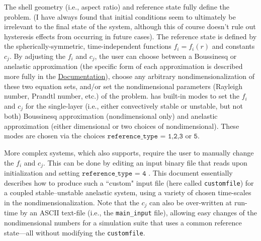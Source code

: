 \documentclass[12pt]{article}
\numberwithin{equation}{section}
\begin{document}
The shell geometry (i.e., aspect ratio) and reference state fully define the problem. (I have always found that initial conditions seem to ultimately be irrelevant to the final state of the system, although this of course doesn't rule out hysteresis effects from occurring in future cases). The reference state is defined by the spherically-symmetric, time-independent functions $f_i=f_i(r)$ and constants $c_j$. By adjusting the $f_i$ and $c_j$, the user can choose between a Boussinesq or anelastic approximation (the specific form of each approximation is described more fully in the  \href{https://rayleigh-documentation.readthedocs.io/en/latest/doc/source/User_Guide/physics_math_overview.html#the-system-of-equations-solved-in-rayleigh}{Documentation}), choose any arbitrary nondimensionalization of these two equation sets, and/or set the nondimensional parameters (Rayleigh number, Prandtl number, etc.) of the problem.  {\rayleigh} has built-in modes to set the $f_i$ and $c_j$ for the single-layer (i.e., either convectively stable or unstable, but not both) Boussinesq approximation (nondimensional only) and anelastic approximation (either dimensional or two choices of nondimensional). These modes are chosen via the choices $\texttt{reference\_type = 1,2,3}$ or $\texttt{5}$. 

More complex systems, which {\rayleigh} also supports, require the user to manually change the $f_i$ and $c_j$. This can be done by editing an input binary file that {\rayleigh} reads upon initialization and setting $\texttt{reference\_type = 4}$ . This document essentially describes how to produce such a ``custom" input file (here called {\texttt{customfile}}) for a coupled stable--unstable anelastic system, using a variety of chosen time-scales in the nondimensionalization. Note that the $c_j$ can also be over-written at run-time by an ASCII text-file (i.e., the \texttt{main\_input} file), allowing easy changes of the nondimensional numbers for a simulation suite that uses a common reference state---all without modifying the  {\texttt{customfile}}.
	
\end{document}
